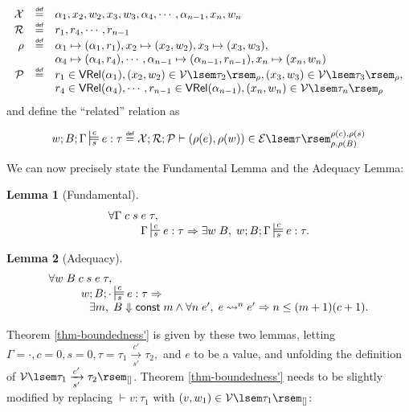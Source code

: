 \documentclass[preprint]{sigplanconf}
\newcommand{\typing}[4]{\sststile{#4}{#3}#1:#2}
\newcommand{\related}[4]{\sdtstile{#4}{#3}#1:#2}
\newcommand{\arrow}[4]{#1\xrightarrow[#3]{#2}#4}
\newcommand{\relV}[1]{\mathcal{V}\lsem#1\rsem}
\newcommand{\relE}[1]{\mathcal{E}\lsem#1\rsem}
\newcommand\defeq{\mathrel{\overset{\makebox[0pt]{\mbox{\normalfont\tiny\sffamily def}}}{=}}}
\newtheorem{lem}{Lemma}
\begin{document}
$$
\begin{array}{rcl}
\mathcal{X}&\defeq&\alpha_1,x_2,w_2,x_3,w_3,\alpha_4,\cdots,\alpha_{n-1},x_n,w_n \\
\mathcal{R}&\defeq&r_1,r_4,\cdots,r_{n-1} \\
\rho&\defeq&\alpha_1\mapsto(\alpha_1,r_1),x_2\mapsto(x_2,w_2),x_3\mapsto(x_3,w_3),\\
& & \alpha_4\mapsto(\alpha_4,r_4),\cdots,\alpha_{n-1}\mapsto(\alpha_{n-1},r_{n-1}),x_n\mapsto(x_n,w_n) \\
\mathcal{P}&\defeq&r_1\in\mathsf{VRel}(\alpha_1),(x_2,w_2)\in\relV{\tau_2}_\rho,(x_3,w_3)\in\relV{\tau_3}_\rho,\\
& & r_4\in\mathsf{VRel}(\alpha_4),\cdots,r_{n-1}\in\mathsf{VRel}(\alpha_{n-1}),(x_n,w_n)\in\relV{\tau_n}_\rho
\end{array}
$$
and define the ``related'' relation as

$$
w;B;\Gamma\related{e}{\tau}{c}{s}\defeq\mathcal{X};\mathcal{R};\mathcal{P}\vdash(\rho(e),\rho(w))\in\relE{\tau}^{\rho(c),\rho(s)}_{\rho,\rho(B)}
$$

We can now precisely state the Fundamental Lemma and the Adequacy Lemma:

\begin{lem}[\label{lem-fundamental}Fundamental]
$$
\begin{array}{l}
\forall \Gamma\;c\;s\;e\;\tau,\\
\hspace{.4in} \Gamma\typing{e}{\tau}{c}{s} \Rightarrow \exists w\;B,\; w;B;\Gamma\related{e}{\tau}{c}{s}.\\
\end{array}
$$
\end{lem}

\begin{lem}[\label{lem-adequacy}Adequacy]
$$
\begin{array}{l}
\forall w\;B\;c\;s\;e\;\tau,\\
\hspace{.4in} w;B;\cdot\related{e}{\tau}{c}{s} \Rightarrow \\
\hspace{.5in} \exists m,\; B\Downarrow \mathsf{const}\;m \wedge \forall n\;e',\;e\leadsto^ne'\Rightarrow n\leq(m+1)(c+1). \\
\end{array}
$$
\end{lem}

Theorem \ref{thm-boundedness'} is given by these two lemmas, letting $\Gamma=\cdot,c=0,s=0,\tau=\arrow{\tau_1}{c'}{s'}{\tau_2},$ and $e$ to be a value, and unfolding the definition of $\relV{\arrow{\tau_1}{c'}{s'}{\tau_2}}_{[]}$. Theorem \ref{thm-boundedness'} needs to be slightly modified by replacing $\vdash v:\tau_1$ with $(v,w_1)\in\relV{\tau_1}_{[]}$:
\end{document}
